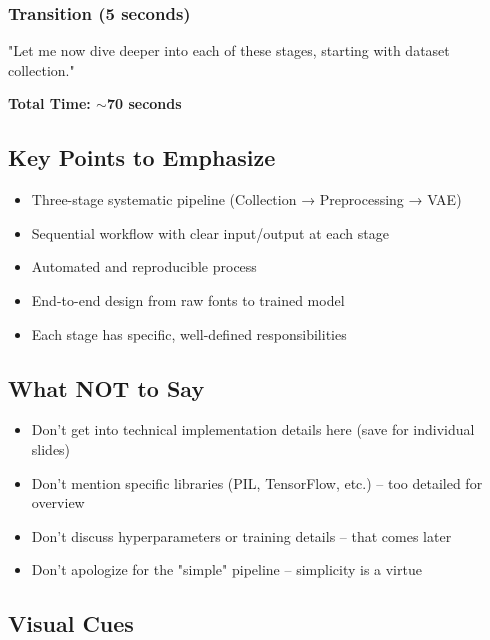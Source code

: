 \documentclass[11pt,a4paper]{article}
\begin{document}
\subsubsection*{Transition (5 seconds)}
\begin{scriptbox}
"Let me now dive deeper into each of these stages, starting with dataset collection."
\end{scriptbox}

\textbf{Total Time: $\sim$70 seconds}

\subsection{Key Points to Emphasize}

\begin{keybox}
\begin{itemize}[leftmargin=0.5cm]
    \item Three-stage systematic pipeline (Collection → Preprocessing → VAE)
    \item Sequential workflow with clear input/output at each stage
    \item Automated and reproducible process
    \item End-to-end design from raw fonts to trained model
    \item Each stage has specific, well-defined responsibilities
\end{itemize}
\end{keybox}

\subsection{What NOT to Say}

\begin{warningbox}
\begin{itemize}[leftmargin=0.5cm]
    \item Don't get into technical implementation details here (save for individual slides)
    \item Don't mention specific libraries (PIL, TensorFlow, etc.) -- too detailed for overview
    \item Don't discuss hyperparameters or training details -- that comes later
    \item Don't apologize for the "simple" pipeline -- simplicity is a virtue
\end{itemize}
\end{warningbox}

\subsection{Visual Cues}
\end{document}
